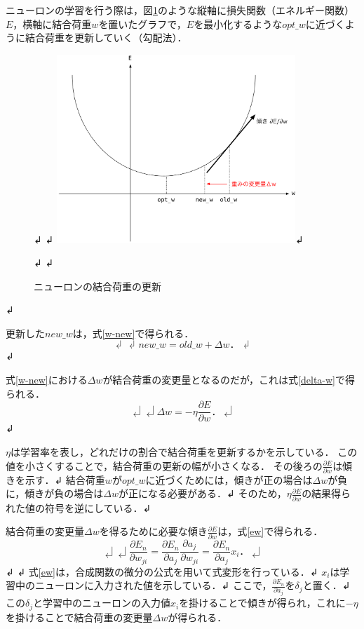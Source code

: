 ニューロンの学習を行う際は，図\ref{bp}のような縦軸に損失関数（エネルギー関数）$E$，横軸に結合荷重$w$を置いたグラフで，$E$を最小化するような$opt\_w$に近づくように結合荷重を更新していく（勾配法）．

\begin{figure}[hbtp]↲
    \centering↲
    \includegraphics[bb=0 0 749 592, width=9cm]{Figures/bp.pdf}↲
    \caption{ニューロンの結合荷重の更新}↲
    \label{bp}↲
\end{figure}↲

更新した$new\_w$は，式\ref{w-new}で得られる．
\begin{equation}↲
\label{w-new}↲
new\_w = old\_w + \Delta w．↲
\end{equation}↲

式\ref{w-new}における$\Delta w$が結合荷重の変更量となるのだが，これは式\ref{delta-w}で得られる．
\begin{equation}↲
\label{delta-w}↲
\Delta w = - \eta \frac{\partial E}{\partial w}．↲
\end{equation}↲

$\eta$は学習率を表し，どれだけの割合で結合荷重を更新するかを示している．
この値を小さくすることで，結合荷重の更新の幅が小さくなる．
その後ろの$\frac{\partial E}{\partial w}$は傾きを示す．↲
結合荷重$w$が$opt\_w$に近づくためには，傾きが正の場合は$\Delta w$が負に，傾きが負の場合は$\Delta w$が正になる必要がある．↲
そのため，$\eta \frac{\partial E}{\partial w}$の結果得られた値の符号を逆にしている．↲

結合荷重の変更量$\Delta w$を得るために必要な傾き$\frac{\partial E}{\partial w}$は，式\ref{ew}で得られる．
\begin{equation}↲
\label{ew}↲
\frac{\partial E_n}{\partial w_{ji}} = \frac{\partial E_n}{\partial a_j} \frac{\partial a_j}{\partial w_{ji}} = \frac{\partial E_n}{\partial a_j} x_i．↲
\end{equation}↲
↲
式\ref{ew}は，合成関数の微分の公式を用いて式変形を行っている．↲
$x_i$は学習中のニューロンに入力された値を示している．↲
ここで，$\frac{\partial E_n}{\partial a_j}$を$\delta_j$と置く．↲
この$\delta_j$と学習中のニューロンの入力値$x_i$を掛けることで傾きが得られ，これに$- \eta$を掛けることで結合荷重の変更量$\Delta w$が得られる．

